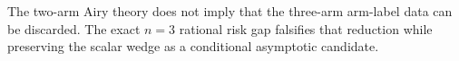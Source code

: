 The two-arm Airy theory does not imply that the three-arm arm-label data can be discarded.  The exact \(n=3\) rational risk gap falsifies that reduction while preserving the scalar wedge as a conditional asymptotic candidate.